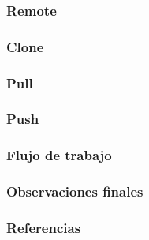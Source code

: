 \documentclass{beamer}
\begin{document}
\begin{frame}
\frametitle{Remote}
\end{frame}

\begin{frame}
\frametitle{Clone}
\end{frame}

\begin{frame}
\frametitle{Pull}
\end{frame}

\begin{frame}
\frametitle{Push}
\end{frame}

\begin{frame}
\frametitle{Flujo de trabajo}
\end{frame}

\begin{frame}
\frametitle{Observaciones finales}
\end{frame}

\begin{frame}
  \frametitle{Referencias}
\end{frame}
\end{document}
